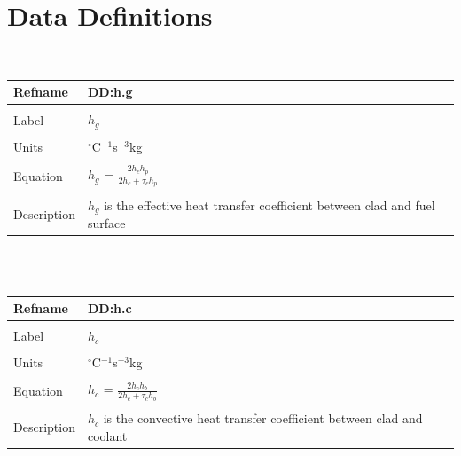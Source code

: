 \documentclass[preprint, 10pt]{sigplanconf}
\begin{document}
\section*{Data Definitions}
\label{Sec:DD}
~\newline \noindent \begin{minipage}{.7\textwidth}
\begin{tabular}{p{} p{}}
\toprule \textbf{Refname} & \textbf{DD:h.g}
\label{DD:h.g}
\\ \midrule \\
Label & $h_{g}$
\\ \midrule \\
Units & ${}^{\circ}$C$^{-1}$s$^{-3}$kg
\\ \midrule \\
Equation & $h_{g}$ = $\frac{2h_{c}h_{p}}{2h_{c}+\tau{}_{c}h_{p}}$
\\ \midrule \\
Description & $h_{g}$ is the effective heat transfer
coefficient between clad and fuel surface
\\ \bottomrule \end{tabular}
\end{minipage}\\
~\newline \noindent \begin{minipage}{.7\textwidth}
\begin{tabular}{p{} p{}}
\toprule \textbf{Refname} & \textbf{DD:h.c}
\label{DD:h.c}
\\ \midrule \\
Label & $h_{c}$
\\ \midrule \\
Units & ${}^{\circ}$C$^{-1}$s$^{-3}$kg
\\ \midrule \\
Equation & $h_{c}$ = $\frac{2h_{c}h_{b}}{2h_{c}+\tau{}_{c}h_{b}}$
\\ \midrule \\
Description & $h_{c}$ is the convective heat transfer
coefficient between clad and coolant
\\ \bottomrule \end{tabular}
\end{minipage}\\

%

\clearpage
\twocolumn


%
%
%
%
\end{document}
